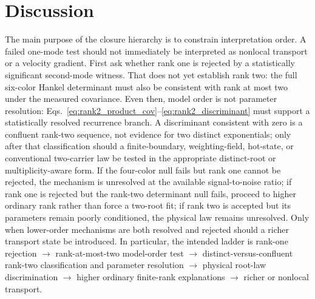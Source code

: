 \documentclass[11pt]{article}
\begin{document}
\section{Discussion}

The main purpose of the closure hierarchy is to constrain interpretation order. A failed one-mode test should not immediately be interpreted as nonlocal transport or a velocity gradient. First ask whether rank one is rejected by a statistically significant second-mode witness. That does not yet establish rank two: the full six-color Hankel determinant must also be consistent with rank at most two under the measured covariance. Even then, model order is not parameter resolution: Eqs.~\eqref{eq:rank2_product_cov}--\eqref{eq:rank2_discriminant} must support a statistically resolved recurrence branch. A discriminant consistent with zero is a confluent rank-two sequence, not evidence for two distinct exponentials; only after that classification should a finite-boundary, weighting-field, hot-state, or conventional two-carrier law be tested in the appropriate distinct-root or multiplicity-aware form. If the four-color null fails but rank one cannot be rejected, the mechanism is unresolved at the available signal-to-noise ratio; if rank one is rejected but the rank-two determinant null fails, proceed to higher ordinary rank rather than force a two-root fit; if rank two is accepted but its parameters remain poorly conditioned, the physical law remains unresolved. Only when lower-order mechanisms are both resolved and rejected should a richer transport state be introduced. In particular, the intended ladder is rank-one rejection $\rightarrow$ rank-at-most-two model-order test $\rightarrow$ distinct-versus-confluent rank-two classification and parameter resolution $\rightarrow$ physical root-law discrimination $\rightarrow$ higher ordinary finite-rank explanations $\rightarrow$ richer or nonlocal transport.
\end{document}
